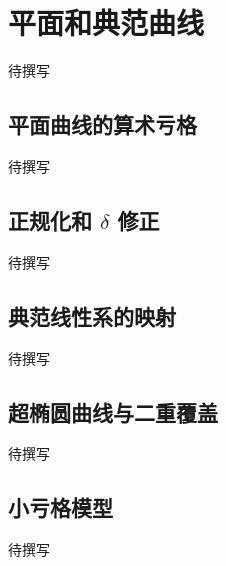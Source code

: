 
% 
% 

\section{平面和典范曲线}
\label{g5:sec:2402}

待撰写

\subsection{平面曲线的算术亏格}
\label{g5:subsec:2402:01}
待撰写

\subsection{\texorpdfstring{正规化和 \(\delta\) 修正}{正规化和 \GeometryPdfDelta{} 修正}}
\label{g5:subsec:2402:02}
待撰写

\subsection{典范线性系的映射}
\label{g5:subsec:2402:03}
待撰写

\subsection{超椭圆曲线与二重覆盖}
\label{g5:subsec:2402:04}
待撰写

\subsection{小亏格模型}
\label{g5:subsec:2402:05}
待撰写
